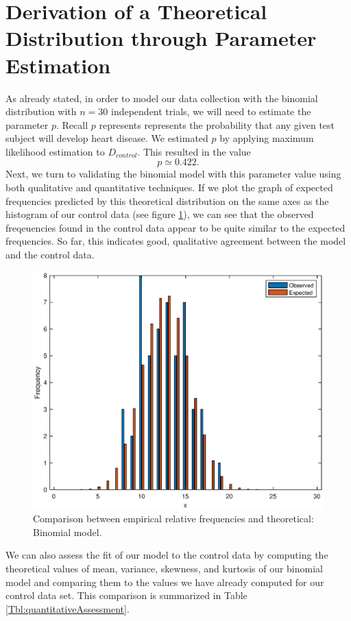 \documentclass{amsart}
\begin{document}
\section{Derivation of a Theoretical Distribution through Parameter Estimation}
As already stated, in order to model our data collection with the binomial distribution with $n=30$ independent trials, we will need to estimate the parameter $p$. Recall $p$ represents represents the probability that any given test subject will develop heart disease. We estimated $p$ by applying maximum likelihood estimation to $D_{control}$. This resulted in the value
\[
p\simeq 0.422.
\]
Next, we turn to validating the binomial model with this parameter value using both qualitative and quantitative techniques. If we plot the graph of expected frequencies predicted by this theoretical distribution on the same axes as the histogram of our control data (see figure \ref{F:graphicalAssessement}), we can see that the observed freqeuencies found in the control data appear to be quite similar to the expected frequencies. So far, this indicates good, qualitative agreement between the model and the control data.
\begin{figure}
\centering
\includegraphics[scale=0.55]{histvalidationfinal}
\caption{
Comparison between empirical relative frequencies and theoretical: Binomial model.\label{F:graphicalAssessement}}
\end{figure}
We can also assess the fit of our model to the control data by computing the theoretical values of mean, variance, skewness, and kurtosis of our binomial model and comparing them to the values we have already computed for our control data set. This comparison is summarized in Table \ref{Tbl:quantitativeAssessment}.
\end{document}
